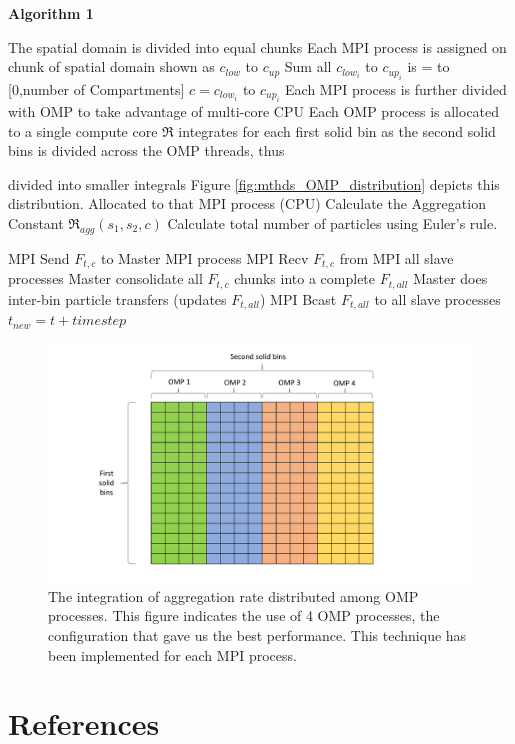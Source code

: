 \documentclass[preprint,11pt,authoryear]{elsarticle}
\begin{document}
\begin{algorithm}[H]
    \caption*{\textbf{Algorithm 1}}
    \label{alg:MyAlgorithm}
    \begin{algorithmic}[1]
        
        \State The spatial domain is divided into equal chunks
        \State Each MPI process is assigned on chunk of spatial domain shown as $c_{low}$ to $c_{up}$ 
        \State Sum all $c_{low_i}$ to $c_{up_i}$ is = to [0,number of Compartments]
         $c = c_{low_i}$ to $c_{up_i}$
        \State Each MPI process is further divided with OMP to take advantage of multi-core CPU
        \State Each OMP process is allocated to a single compute core
        \State $\Re$ integrates for each first solid bin as the second solid bins is 
        divided across the OMP threads, thus 

        divided into smaller integrals 
        Figure \ref{fig:mthds_OMP_distribution} depicts this distribution.
        \State Allocated to that MPI process (CPU)
        \State Calculate the Aggregation Constant $\Re_{agg}(s_1,s_2,c)$
        \EndFor
            \State  Calculate total number of particles using Euler's rule. 

        \EndFor
            \State MPI Send $F_{t,c}$ to Master MPI process
            \State MPI Recv $F_{t,c}$ from MPI all slave processes
            \State Master consolidate all $F_{t,c}$ chunks into a complete $F_{t,all}$
            \State Master does inter-bin particle transfers (updates $F_{t,all}$)
            \State MPI Bcast $F_{t,all}$ to all slave processes
            \State $t_{new} = t + timestep$
        \EndWhile   
        
    \end{algorithmic}
\end{algorithm}  
 
\begin{figure}[H]
\centering
\includegraphics[scale=0.5]{OMP_table.pdf}
\caption{The integration of aggregation rate distributed among OMP processes. This figure indicates the use of 4 OMP processes, the 
configuration that gave us the best performance. This technique has been implemented for each MPI process.}
\label{fig:app_OMP_distribution}
\end{figure}	

\section*{References} 


\end{document}
